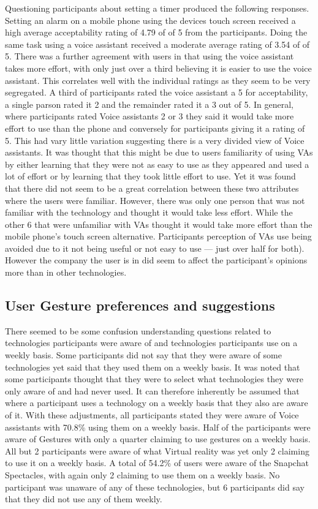 \documentclass{l4proj}
\begin{document}
Questioning participants about setting a timer produced the following responses. Setting an alarm on a mobile phone using the devices touch screen received a high average acceptability rating of 4.79 of of 5 from the participants. Doing the same task using a voice assistant received a moderate average rating of 3.54 of of 5. There was a further agreement with users in that using the voice assistant takes more effort, with only just over a third believing it is easier to use the voice assistant. This correlates well with the individual ratings as they seem to be very segregated. A third of participants rated the voice assistant a 5 for acceptability, a single parson rated it 2 and the remainder rated it a 3 out of 5. In general, where participants rated Voice assistants 2 or 3 they said it would take more effort to use than the phone and conversely for participants giving it a rating of 5. This had vary little variation suggesting there is a very divided view of Voice assistants. It was thought that this might be due to users familiarity of using VAs by either learning that they were not as easy to use as they appeared and used a lot of effort or by learning that they took little effort to use. Yet it was found that there did not seem to be a great correlation between these two attributes where the users were familiar. However, there was only one person that was not familiar with the technology and thought it would take less effort. While the other 6 that were unfamiliar with VAs thought it would take more effort than the mobile phone's touch screen alternative. Participants perception of VAs use being avoided due to it not being useful or not easy to use --- just over half for both). However the company the user is in did seem to affect the participant's opinions more than in other technologies.

\subsection{User Gesture preferences and suggestions}

There seemed to be some confusion understanding questions related to technologies participants were aware of and technologies participants use on a weekly basis. Some participants did not say that they were aware of some technologies yet said that they used them on a weekly basis. It was noted that some participants thought that they were to select what technologies they were only aware of and had never used. It can therefore inherently be assumed that where a participant uses a technology on a weekly basis that they also are aware of it. With these adjustments, all participants stated they were aware of Voice assistants with 70.8\% using them on a weekly basis. Half of the participants were aware of Gestures with only a quarter claiming to use gestures on a weekly basis. All but 2 participants were aware of what Virtual reality was yet only 2 claiming to use it on a weekly basis. A total of 54.2\% of users were aware of the Snapchat Spectacles, with again only 2 claiming to use them on a weekly basis. No participant was unaware of any of these technologies, but 6 participants did say that they did not use any of them weekly.
\end{document}

